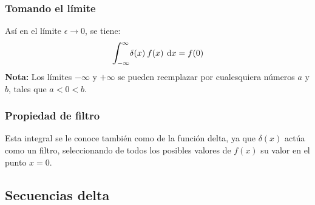 \documentclass[12pt]{beamer}
\begin{document}
\begin{frame}
\frametitle{Tomando el límite}
Así en el límite $\epsilon \to 0$, se tiene:
\pause
\begin{align*}
\scaleint{6ex}_{\bs -\infty}^{\infty} \delta (x) \: f (x) \: \dd{x} = f (0)
\end{align*}
\textbf{Nota: } Los límites $-\infty$ y $+\infty$ se pueden reemplazar por cualesquiera números $a$ y $b$, tales que $a < 0 < b$.
\end{frame}
\begin{frame}
\frametitle{Propiedad de filtro}
Esta integral se le conoce también como  de la función delta, \pause ya que $\delta (x)$ actúa como un filtro, seleccionando de todos los posibles valores de $f (x)$ su valor en el punto $x = 0$.
\end{frame}

\subsection{Secuencias delta}\label{secuencias_delta}
\end{document}
